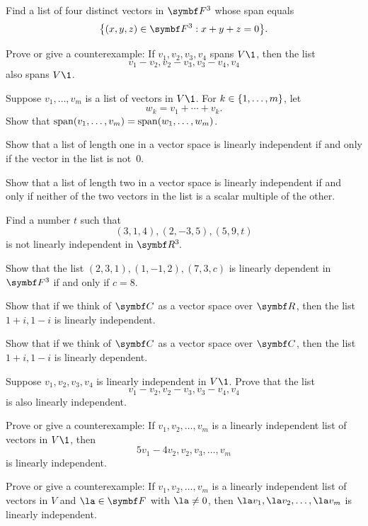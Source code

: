 \begin{exercises}

\exercise
Find a list of four distinct vectors in $\F3$ whose span equals
\[
\br[\big]{(x, y,z) \in \F3: x+y+z = 0}.
\]
\exercisedisplayend


\exercise
Prove or give a counterexample: If $v_1, v_2, v_3, v_4$ spans $V\1$, then the list
\[
v_1 - v_2, v_2 - v_3, v_3 - v_4, v_4
\]
also spans $V\1$.


\exercise
Suppose $v_1, \ldots, v_m$ is a list of vectors in $V\1$. For $k \in \{1, \ldots, m\}$, let\label{2span}
\[
w_k = v_1 + \cdots + v_k.
\]
Show that $\operatorname{span}(v_1, \ldots, v_m) = \operatorname{span}(w_1, \ldots, w_m)$.


\exercise
\begin{SUBtheorem}
\item
Show that a list of length one in a vector space is linearly independent if and only if the vector in the list is not~$0$.
\item
Show that a list of length two in a vector space is linearly independent if and only if neither of the two vectors in the list is a scalar multiple of the other.
\end{SUBtheorem}


\exercise
Find a number $t$ such that
\[
(3,1, 4), (2, -3, 5), (5, 9, t)
\]
is not linearly independent in $\RR3$.


\exercise
Show that the list $(2, 3, 1), (1, -1, 2), (7, 3, c)$ is linearly dependent in $\F{3}$ if and only if $c = 8$.


\exercise
\begin{SUBtheorem}
\item
Show that if we think of $\C{}$ as a vector space over $\R{}$, then the list \mbox{$1 + i, 1 - i$} is linearly independent.
\item
Show that if we think of $\C{}$ as a vector space over $\C{}$, then the list \mbox{$1 + i, 1 - i$} is linearly dependent.
\end{SUBtheorem}


\exercise
Suppose $v_1, v_2, v_3, v_4$ is linearly independent in $V\1$. Prove that the
list
\[
v_1 - v_2, v_2 - v_3, v_3 - v_4, v_4
\]
is also linearly independent.


\exercise
Prove or give a counterexample: If $v_1, v_2, \dots, v_m$ is a linearly independent list of vectors in $V\1$, then
\[
5v_1 - 4v_2, v_2, v_3, \dots, v_m
\]
is linearly independent.


\exercise
Prove or give a counterexample: If $v_1, v_2, \dots, v_m$ is a linearly independent list of vectors in $V$ and $\la \in \F{}$ with $\la \ne 0$, then $\la v_1, \la v_2, \dots,\la v_m$ is linearly independent.



\end{exercises}
